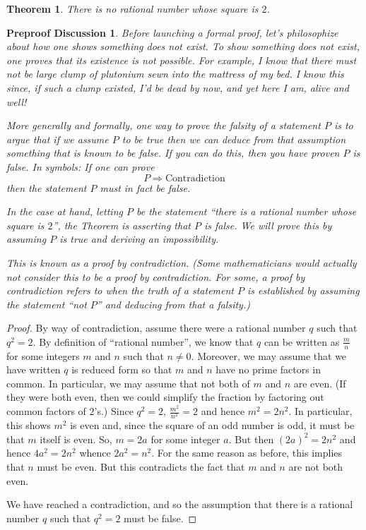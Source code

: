 \documentclass[12pt]{amsart}
\numberwithin{equation}{section}
\theoremstyle{plain} %
\newtheorem{thm}[equation]{Theorem}
\newtheorem{preproof}{Preproof Discussion}
\theoremstyle{definition}
\theoremstyle{remark}
\begin{document}
\begin{thm} There is no rational number whose square is $2$. 
\end{thm}

\begin{preproof} Before launching a formal proof, let's philosophize
  about how one shows something does not exist. To show something does
  not exist, one proves  that its existence is
  not possible. For example, I know that  there must not be large clump of plutonium sewn into the mattress of my bed. I know this since, if such a clump existed, I'd be
  dead by now, and yet here I am, alive and well!

More generally and formally, one way to prove the falsity of a
statement $P$ is to argue that if we assume $P$ to be true then we can deduce from that
assumption something that is known
to be false. If you can do this, then you have proven $P$ is false. In symbols:
If one can prove
$$
P \Longrightarrow \text{Contradiction}
$$
then the statement $P$ must in fact be  false.

In the case at hand, letting  $P$ be the statement ``there is a rational number whose square is $2$'', the Theorem is asserting that $P$ is false. We will prove
this by assuming $P$ is true and deriving an impossibility.

This is known as a proof by contradiction. (Some mathematicians would actually not consider this to be a proof by contradiction. For some, a proof by
contradiction refers to when the truth of a statement $P$ is established by assuming the statement ``not $P$'' and deducing from that a falsity.) 
\end{preproof}

\begin{proof} By way of contradiction, assume there were a rational number $q$ such that $q^2 = 2$. By definition of ``rational number'',  
we know that $q$ can be written as  $\frac{m}{n}$ for
some integers $m$ and $n$ such that $n \ne 0$. Moreover, we may assume that we have written $q$ is reduced form so that $m$ and $n$ have no
prime factors in common. In particular, we may assume that not both of $m$ and $n$ are even. (If they
  were both even, then  we could simplify the fraction by factoring out common factors of $2$'s.) Since $q^2 = 2$,
  $\frac{m^2}{n^2} = 2$ and hence $m^2 = 2n^2$. In particular, this shows $m^2$ is even and, since the square of an odd number is odd, it must be that $m$
  itself is even. So, $m = 2 a$ for some integer $a$. But then $(2a)^2 = 2n^2$ and hence $4a^2 = 2n^2$ whence $2a^2 = n^2$. For the same reason as before, this
  implies that $n$
  must be even. But this contradicts the fact that $m$ and $n$ are not both even. 

We have reached a contradiction, and so the assumption that there is a rational number $q$ such that $q^2 = 2$ must be false.
\end{proof}
\end{document}
